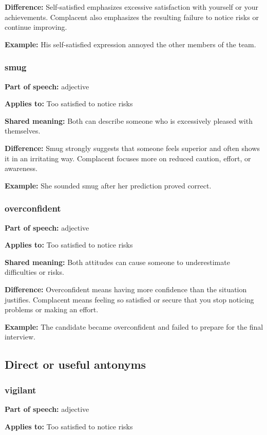 \documentclass[11pt]{article}
\begin{document}
\textbf{Difference:} Self-satisfied emphasizes excessive satisfaction with yourself or your achievements. Complacent also emphasizes the resulting failure to notice risks or continue improving.

\textbf{Example:} His self-satisfied expression annoyed the other members of the team.

\subsubsection{smug}
\textbf{Part of speech:} adjective

\textbf{Applies to:} Too satisfied to notice risks

\textbf{Shared meaning:} Both can describe someone who is excessively pleased with themselves.

\textbf{Difference:} Smug strongly suggests that someone feels superior and often shows it in an irritating way. Complacent focuses more on reduced caution, effort, or awareness.

\textbf{Example:} She sounded smug after her prediction proved correct.

\subsubsection{overconfident}
\textbf{Part of speech:} adjective

\textbf{Applies to:} Too satisfied to notice risks

\textbf{Shared meaning:} Both attitudes can cause someone to underestimate difficulties or risks.

\textbf{Difference:} Overconfident means having more confidence than the situation justifies. Complacent means feeling so satisfied or secure that you stop noticing problems or making an effort.

\textbf{Example:} The candidate became overconfident and failed to prepare for the final interview.

\subsection{Direct or useful antonyms}
\subsubsection{vigilant}
\textbf{Part of speech:} adjective

\textbf{Applies to:} Too satisfied to notice risks
\end{document}
